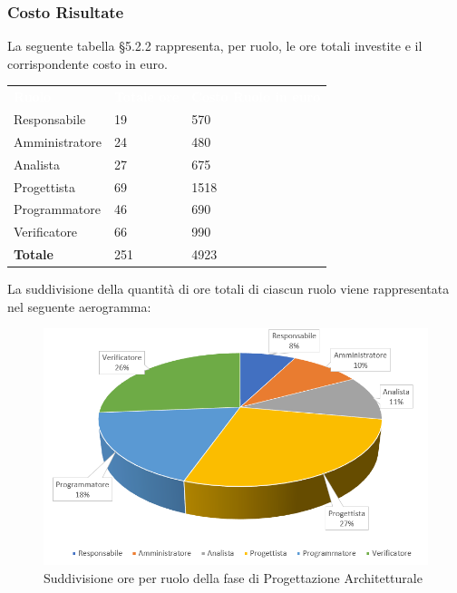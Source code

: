 \subsubsection{Costo Risultate}
La seguente tabella §5.2.2 rappresenta, per ruolo, le ore totali investite e il corrispondente costo in euro.
{
	\renewcommand{\arraystretch}{2}
	\centering
	\begin{longtable}{ C{3cm} C{2cm} C{4cm}}
		\textcolor{white}{\textbf{Ruolo}} & \textcolor{white}{\textbf{Totale ore}} & \textcolor{white}{\textbf{Costo Ruolo in euro}}\\	
        
        Responsabile & 19 & 570 \\
        Amministratore & 24 & 480 \\
        Analista & 27 & 675 \\
        Progettista & 69 & 1518 \\
        Programmatore & 46 & 690 \\
        Verificatore & 66 & 990 \\
        \textbf{Totale} & 251 & 4923 \\
		
	\end{longtable}
}

La suddivisione della quantità di ore totali di ciascun ruolo viene rappresentata nel seguente aerogramma:

\begin{figure}[h]
	\centering
	\includegraphics[scale=2]{sezioni/Aerogrammi/AerogrammaProgettArchitetturale.png}
	\caption{Suddivisione ore per ruolo della fase di Progettazione Architetturale}
\end{figure}

